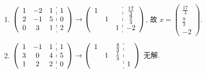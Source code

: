 	 \paragraph{} %
		 \begin{enumerate}
			 \item %
			       $\left(\begin{array}{ccc:c}
					       1 & -2 & 1 & 1 \\
					       2 & -1 & 5 & 0 \\
					       0 & 3  & 1 & 2
				       \end{array}\right) \to \left(\begin{array}{ccc:c}
					       1 &   &   & \frac{17}{3} \\
					         & 1 &   & \frac{9}{3}  \\
					         &   & 1 & -2
				       \end{array}\right)$,
			       故 $x = \begin{pmatrix}
					       \frac{17}{3} \\
					       \frac{9}{3}  \\
					       -2
				       \end{pmatrix}$.

			 \item %
			       $\left(\begin{array}{ccc:c}
					       1 & -1 & 1 & 1 \\
					       3 & 0  & 4 & 5 \\
					       1 & 2  & 2 & 0
				       \end{array}\right) \to \left(\begin{array}{ccc:c}
					       1 &   & \frac{4}{3} &   \\
					         & 1 & \frac{1}{3} &   \\
					         &   &             & 1
				       \end{array}\right)$ 无解.


\end{enumerate}
